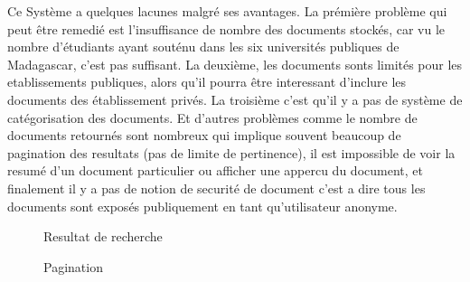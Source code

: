 Ce Système a quelques lacunes malgré ses avantages. La prémière problème qui peut être remedié est l'insuffisance de nombre des documents stockés, car vu le nombre d'étudiants ayant souténu dans les six universités publiques de Madagascar, c'est pas suffisant. La deuxième, les documents sonts limités pour les etablissements publiques, alors qu'il pourra être interessant d'inclure les documents des établissement privés. La troisième c'est qu'il y a pas de système de catégorisation des documents. Et d'autres problèmes comme le nombre de documents retournés sont nombreux qui implique souvent beaucoup de pagination des resultats (pas de limite de pertinence), il est impossible de voir la resumé d'un document particulier ou afficher une appercu du document, et finalement il y a pas de notion de securité de document c'est a dire tous les documents sont exposés publiquement en tant qu'utilisateur anonyme.

\begin{figure}[htbp]
	\begin{center}
	\end{center}
	\caption{Resultat de recherche \citep{these-malgache-en-ligne}}
	\label{fig:resultat-tme}
\end{figure}

\begin{figure}[htbp]
	\begin{center}
	\end{center}
	\caption{Pagination \citep{these-malgache-en-ligne}}
	\label{fig:pagination-tme}
\end{figure}

